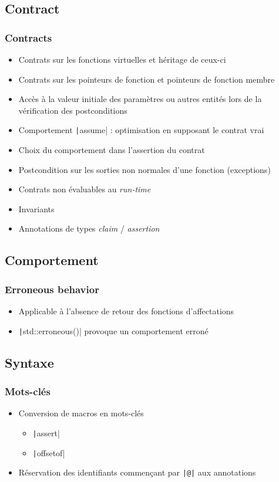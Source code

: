 \documentclass[C++.tex]{subfiles}
\begin{document}
\subsection*{Contract}
\begin{frame}[fragile]
	\frametitle{Contracts}
	\begin{itemize}
		\item Contrats sur les fonctions virtuelles et héritage de ceux-ci
		\item Contrats sur les pointeurs de fonction et pointeurs de fonction membre
		\item Accès à la valeur initiale des paramètres ou autres entités lors de la vérification des postconditions
		\item Comportement \texttt|assume| : optimisation en supposant le contrat vrai
		\item Choix du comportement dans l'assertion du contrat
		\item Postcondition sur les sorties non normales d'une fonction (exceptions)
		\item Contrats non évaluables au \textit{run-time}
		\item Invariants
		\item Annotations de types \textit{claim} / \textit{assertion}
	\end{itemize}
\end{frame}

\subsection*{Comportement}
\begin{frame}[fragile]
	\frametitle{Erroneous behavior}
	\begin{itemize}
		\item Applicable à l'absence de retour des fonctions d'affectations
		\item \texttt|std::erroneous()| provoque un comportement erroné
	\end{itemize}

\end{frame}

\subsection*{Syntaxe}
\begin{frame}[fragile]
	\frametitle{Mots-clés}
	\begin{itemize}
		\item Conversion de macros en mots-clés
		\begin{itemize}
			\item \texttt|assert|
			\item \texttt|offsetof|
		\end{itemize}
		\item Réservation des identifiants commençant par \texttt{|@|} aux annotations
	\end{itemize}

\end{frame}
\end{document}
